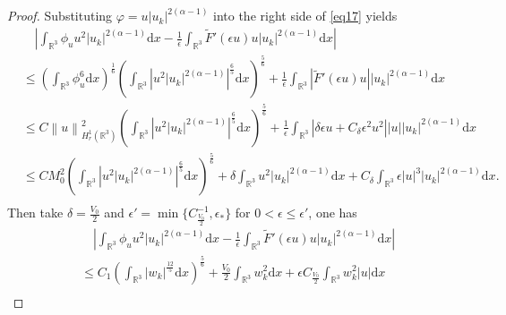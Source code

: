 \documentclass[12pt]{amsart}
\numberwithin{equation}{section}
\theoremstyle{definition}
\begin{document}
\begin{proof}
		Substituting $\varphi =u \left|u_{k} \right|^{2\left ( \alpha -1 \right )}$ into the right side of \eqref{eq17} yields
		\begin{equation*}
			\begin{aligned}
				&\quad\left|\int_{\mathbb{R}^{3}}\phi _{u} u^{2} \left|u_{k} \right|^{2\left ( \alpha -1 \right )}\text{d}x-\frac{1}{\epsilon }\int_{\mathbb{R}^{3}}\widetilde{F}'\left ( \epsilon u \right ) u\left| u_{k}\right|^{2\left ( \alpha -1 \right )}\text{d}x\right|\\
				&\leq \left ( \int_{\mathbb{R}^{3}}\phi _{u}^{6} \text{d}x\right )^{\frac{1}{6}}\left ( \int_{\mathbb{R}^{3}}\left|u^{2} \left|u_{k} \right|^{2\left ( \alpha -1 \right )}\right|^{\frac{6}{5}}\text{d}x\right )^{\frac{5}{6}}+\frac{1}{\epsilon }\int_{\mathbb{R}^{3}}\left|\widetilde{F}'\left (\epsilon u \right )u \right| \left| u_{k}\right|^{2\left ( \alpha -1 \right )}\text{d}x\\
				&\leq C \left\|u \right\|_{H_{r}^{1}(\mathbb{R}^3)}^{2}\left ( \int_{\mathbb{R}^{3}}\left|u^{2}\left|u_{k} \right|^{2\left ( \alpha -1 \right )} \right| ^{\frac{6}{5}}\text{d}x\right )^{\frac{5}{6}}+\frac{1}{\epsilon }\int_{\mathbb{R}^{3}}\left| \delta  \epsilon u+C_{\delta} \epsilon ^{2} u^2\right|\left|u\right|\left|u_{k} \right|^{2\left ( \alpha -1 \right )}\text{d}x\\
				&\leq C M^{2}_{0}\left ( \int_{\mathbb{R}^{3}}\left|u^{2}\left|u_{k} \right|^{2\left ( \alpha -1 \right )} \right| ^{\frac{6}{5}}\text{d}x\right )^{\frac{5}{6}}+\delta \int_{\mathbb{R}^{3}}u^{2}\left|u_{k} \right|^{2\left ( \alpha -1 \right )}\text{d}x+C_{\delta }\int_{\mathbb{R}^{3}}\epsilon \left| u\right|^{3}\left| u_{k}\right|^{2\left ( \alpha -1 \right )}\text{d}x.\\
			\end{aligned}
		\end{equation*}
		Then take $\delta=\frac{V_0}{2}$ and $\epsilon'=\min\{C_{\frac{V_0}{2}}^{-1},\epsilon_{\ast}\}$ for $0<\epsilon\leq\epsilon'$, one has
		\begin{equation*}
			\begin{aligned}
            &\quad\left|\int_{\mathbb{R}^{3}}\phi _{u} u^{2} \left|u_{k} \right|^{2\left ( \alpha -1 \right )}\text{d}x-\frac{1}{\epsilon }\int_{\mathbb{R}^{3}}\widetilde{F}'\left ( \epsilon u \right ) u \left| u_{k}\right|^{2\left ( \alpha -1 \right )}\text{d}x\right|\\				
            &\leq C_{1}\left ( \int_{\mathbb{R}^{3}}\left|w_{k} \right|^{\frac{12}{5}} \text{d}x\right )^{\frac{5}{6}}+\frac{V_0}{2}\int_{\mathbb{R}^{3}}w_{k} ^{2} \text{d}x+\epsilon C_{\frac{V_0}{2}}\int_{\mathbb{R}^{3}}w_{k}^{2} \left|u \right|\text{d}x\\

\end{aligned}
\end{equation*}
\end{proof}
\end{document}
